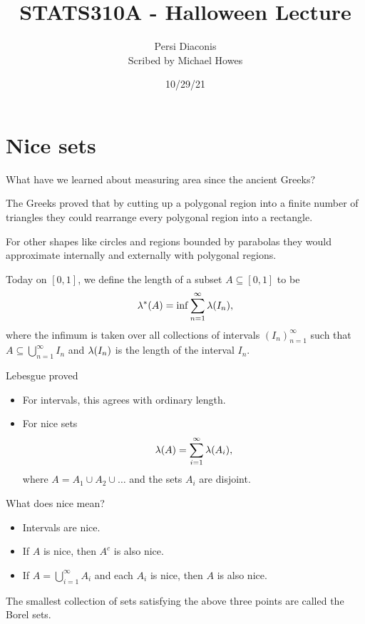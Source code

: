 




\title{STATS310A - Halloween Lecture}
\author{Persi Diaconis\\ Scribed by Michael Howes}
\date{10/29/21}

\pagestyle{fancy}
\fancyhf{}


\maketitle
\tableofcontents
\section{Nice sets}
What have we learned about measuring area since the ancient Greeks?

The Greeks proved that by cutting up a polygonal region into a finite number of triangles they could rearrange every polygonal region into a rectangle. 

For other shapes like circles and regions bounded by parabolas they would approximate internally and externally with polygonal regions.

Today on $[0,1]$, we define the length of a subset $A \subseteq [0,1]$ to be 
\[\lambda^*(A) = \inf \sum_{n=1}^\infty \lambda(I_n), \]
where the infimum is taken over all collections of intervals $(I_n)_{n=1}^\infty$ such that $A \subseteq \bigcup_{n=1}^\infty I_n$ and $\lambda(I_n)$ is the length of the interval $I_n$.

Lebesgue proved
\begin{itemize}
    \item For intervals, this agrees with ordinary length.
    \item For nice sets \[\lambda(A)=\sum_{i=1}^\infty \lambda(A_i), \]  where $A=A_1\cup A_2 \cup \ldots $ and the sets $A_i$ are disjoint.
\end{itemize}
What does nice mean?
\begin{itemize}
    \item Intervals are nice.
    \item If $A$ is nice, then $A^c$ is also nice.
    \item If $A=\bigcup_{i=1}^\infty A_i$ and each $A_i$ is nice, then $A$ is also nice.
\end{itemize}
The smallest collection of sets satisfying the above three points are called the Borel sets.

